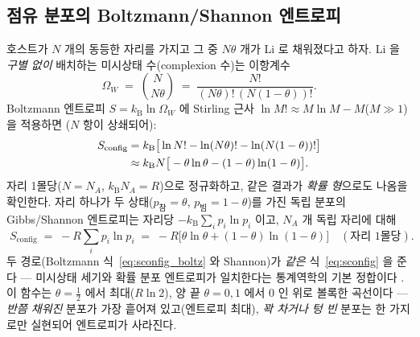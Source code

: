 \documentclass[11pt,a4paper]{article}
\newcommand{\cfg}{\mathrm{config}}
\newcommand{\kB}{k_{\mathrm B}}
\begin{document}
\subsection{점유 분포의 Boltzmann/Shannon 엔트로피}\label{sec:sconfig}
호스트가 $N$ 개의 동등한 자리를 가지고 그 중 $N\theta$ 개가 Li 로 채워졌다고 하자. Li 을 \emph{구별 없이}
배치하는 미시상태 수(complexion 수)는 이항계수
\begin{equation}
\Omega_W \;=\; \binom{N}{N\theta} \;=\; \frac{N!}{(N\theta)!\,(N(1-\theta))!}.
\label{eq:complexions}
\end{equation}
Boltzmann 엔트로피 $S=\kB\ln\Omega_W$ 에 Stirling 근사 $\ln M!\approx M\ln M-M$($M\gg1$)을 적용하면
($N$ 항이 상쇄되어):
\begin{align}
S_\cfg &= \kB\big[\ln N! - \ln(N\theta)! - \ln(N(1-\theta))!\big] \notag\\
       &\approx \kB N\big[-\theta\ln\theta-(1-\theta)\ln(1-\theta)\big].
\label{eq:sconfig_boltz}
\end{align}
자리 1몰당($N=N_A$, $\kB N_A=R$)으로 정규화하고, 같은 결과가 \emph{확률 형}으로도 나옴을 확인한다.
자리 하나가 두 상태($p_\text{참}=\theta$, $p_\text{빔}=1-\theta$)를 가진 독립 분포의 Gibbs/Shannon
엔트로피는 자리당 $-\kB\sum_i p_i\ln p_i$ 이고, $N_A$ 개 독립 자리에 대해
\begin{equation}
\boxed{\;
S_\cfg \;=\; -R\sum_i p_i\ln p_i
        \;=\; -R\big[\theta\ln\theta+(1-\theta)\ln(1-\theta)\big]
\quad(\text{자리 1몰당}).
\;}
\label{eq:sconfig}
\end{equation}
두 경로(Boltzmann 식~\eqref{eq:sconfig_boltz} 와 Shannon)가 \emph{같은} 식~\eqref{eq:sconfig} 을 준다 —
미시상태 세기와 확률 분포 엔트로피가 일치한다는 통계역학의 기본 정합이다 \cite{pathria,newman}. 이 함수는
$\theta=\tfrac12$ 에서 최대($R\ln2$), 양 끝 $\theta=0,1$ 에서 $0$ 인 위로 볼록한 곡선이다 — \emph{반쯤 채워진}
분포가 가장 흩어져 있고(엔트로피 최대), \emph{꽉 차거나 텅 빈} 분포는 한 가지로만 실현되어 엔트로피가
사라진다.
\end{document}
